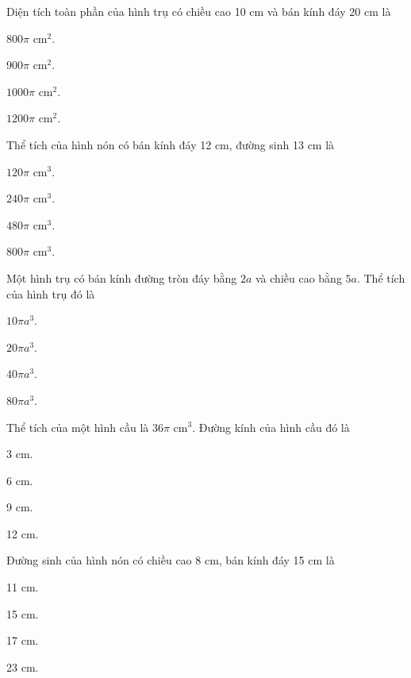 \documentclass[%
    fontsize=12pt,%
    chapterprefix=false,%
    open=right,%
    twoside=false,%
    numbers=noenddot,%
    headings=optiontohead,%
    final,%
    DIV=15,%
    parskip=half %
]{scrbook}
\begin{document}
\begin{tracnghiem}
\item Diện tích toàn phần của hình trụ có chiều cao 10 cm và bán kính đáy 20 cm là
\begin{options}
  \item $ 800\pi $ cm$^2$.
  \item $ 900\pi $ cm$^2$.
  \item $ 1 000\pi $ cm$^2$.
  \item $ 1 200\pi $ cm$^2$.
\end{options}

\item Thể tích của hình nón có bán kính đáy 12 cm, đường sinh 13 cm là
\begin{options}
  \item $ 120\pi $ cm$^3$.
  \item $ 240\pi $ cm$^3$.
  \item $ 480\pi $ cm$^3$.
  \item $ 800\pi $ cm$^3$.
\end{options}

\item Một hình trụ có bán kính đường tròn đáy bằng $2a$ và chiều cao bằng $5a$. Thể tích của hình trụ đó là
\begin{options}
  \item $10 \pi a^3$.
  \item $20 \pi a^3$.
  \item $40 \pi a^3$.
  \item $80 \pi a^3$.
\end{options}

\item Thể tích của một hình cầu là $36 \pi \text{ cm}^3$. Đường kính của hình cầu đó là
\begin{options}
  \item 3 cm.
  \item 6 cm.
  \item 9 cm.
  \item 12 cm.
\end{options}

\item Đường sinh của hình nón có chiều cao 8 cm, bán kính đáy 15 cm là
\begin{options}
  \item 11 cm.
  \item 15 cm.
  \item 17 cm.
  \item 23 cm.
\end{options}


\end{tracnghiem}
\end{document}
